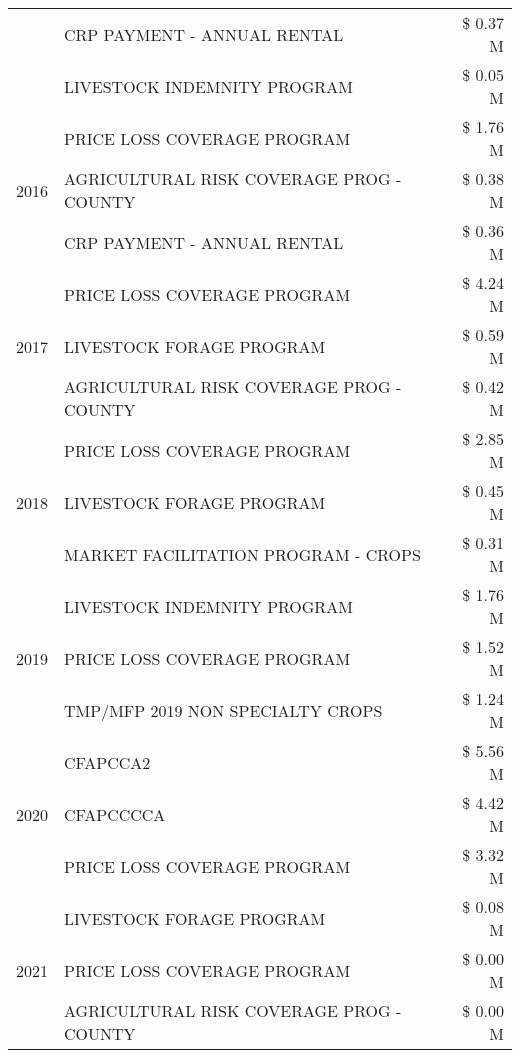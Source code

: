 \begin{tabular}{llr}
 & CRP PAYMENT - ANNUAL RENTAL & \$ 0.37 M \\
 & LIVESTOCK INDEMNITY PROGRAM & \$ 0.05 M \\
\cline{1-3}
\multirow[t]{3}{*}{2016} & PRICE LOSS COVERAGE PROGRAM & \$ 1.76 M \\
 & AGRICULTURAL RISK COVERAGE PROG - COUNTY & \$ 0.38 M \\
 & CRP PAYMENT - ANNUAL RENTAL & \$ 0.36 M \\
\cline{1-3}
\multirow[t]{3}{*}{2017} & PRICE LOSS COVERAGE PROGRAM & \$ 4.24 M \\
 & LIVESTOCK FORAGE PROGRAM & \$ 0.59 M \\
 & AGRICULTURAL RISK COVERAGE PROG - COUNTY & \$ 0.42 M \\
\cline{1-3}
\multirow[t]{3}{*}{2018} & PRICE LOSS COVERAGE PROGRAM & \$ 2.85 M \\
 & LIVESTOCK FORAGE PROGRAM & \$ 0.45 M \\
 & MARKET FACILITATION PROGRAM - CROPS & \$ 0.31 M \\
\cline{1-3}
\multirow[t]{3}{*}{2019} & LIVESTOCK INDEMNITY PROGRAM & \$ 1.76 M \\
 & PRICE LOSS COVERAGE PROGRAM & \$ 1.52 M \\
 & TMP/MFP 2019 NON SPECIALTY CROPS & \$ 1.24 M \\
\cline{1-3}
\multirow[t]{3}{*}{2020} & CFAPCCA2 & \$ 5.56 M \\
 & CFAPCCCCA & \$ 4.42 M \\
 & PRICE LOSS COVERAGE PROGRAM & \$ 3.32 M \\
\cline{1-3}
\multirow[t]{3}{*}{2021} & LIVESTOCK FORAGE PROGRAM & \$ 0.08 M \\
 & PRICE LOSS COVERAGE PROGRAM & \$ 0.00 M \\
 & AGRICULTURAL RISK COVERAGE PROG - COUNTY & \$ 0.00 M \\
\cline{1-3}
\bottomrule
\end{tabular}
